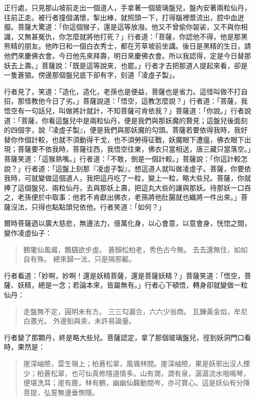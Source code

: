 正行處，只見那山坡前走出一個道人，手拿著一個玻璃盤兒，盤內安著兩粒仙丹，往前正走。被行者撞個滿懷，掣出棒，就照頭一下，打得腦裡漿流出，腔中血迸攛。菩薩大驚道：「你這個猴子，還是這等放潑。他又不曾偷你袈裟，又不與你相識，又無甚冤仇，你怎麼就將他打死？」行者道：「菩薩，你認他不得，他是那黑熊精的朋友。他昨日和一個白衣秀士，都在芳草坡前坐講。後日是黑精的生日，請他們來慶佛衣會。今日他先來拜壽，明日來慶佛衣會。所以我認得，定是今日替那妖去上壽。」菩薩說：「既是這等說來，也罷。」行者才去把那道人提起來看，卻是一隻蒼狼。傍邊那個盤兒底下卻有字，刻道「凌虛子製」。

行者見了，笑道：「造化，造化，老孫也是便益，菩薩也是省力。這怪叫做不打自招，那怪教他今日了劣。」菩薩說道：「悟空，這教怎麼說？」行者道：「菩薩，我悟空有一句話兒，叫做將計就計，不知菩薩可肯依我？」菩薩道：「你說。」行者說道：「菩薩，你看這盤兒中是兩粒仙丹，便是我們與那妖魔的贄見；這盤兒後面刻的四個字，說『凌虛子製』，便是我們與那妖魔的勾頭。菩薩若要依得我時，我好替你作個計較，也就不須動得干戈，也不須勞得征戰，妖魔眼下遭瘟，佛衣眼下出現；菩薩要不依我時，菩薩往西，我悟空往東，佛衣只當相送，唐三藏只當落空。」菩薩笑道：「這猴熟嘴。」行者道：「不敢，倒是一個計較。」菩薩說：「你這計較怎說？」行者道：「這盤上刻那『凌虛子製』，想這道人就叫做凌虛子。菩薩，你要依我時，可就變做這個道人，我把這丹吃了一粒，變上一粒，略大些兒。菩薩，你就捧了這個盤兒、兩粒仙丹，去與那妖上壽，把這丸大些的讓與那妖。待那妖一口吞之，老孫便於中取事：他若不肯獻出佛衣，老孫將他肚腸就也織將一件出來。」菩薩沒法，只得也點點頭兒依他。行者笑道：「如何？」

爾時菩薩迺以廣大慈悲，無邊法力，億萬化身，以心會意，以意會身，恍惚之間，變作凌虛仙子：
\begin{quote}
鶴氅仙風颯，飄颻欲步虛。
蒼顏松柏老，秀色古今無。
去去還無住，如如自有殊。
總來歸一法，只是隔邪軀。
\end{quote}

行者看道：「妙啊，妙啊！還是妖精菩薩，還是菩薩妖精？」菩薩笑道：「悟空，菩薩、妖精，總是一念；若論本來，皆屬無有。」行者心下頓悟，轉身卻就變做一粒仙丹：
\begin{quote}
走盤無不定，圓明未有方。
三三勾漏合，六六少翁商。
瓦鑠黃金焰，牟尼白晝光。
外邊鉛與汞，未許易論量。
\end{quote}

行者變了那顆丹，終是略大些兒。菩薩認定，拿了那個玻璃盤兒，徑到妖洞門口看時，果然是：
\begin{quote}
崖深岫險，雲生嶺上；柏蒼松翠，風颯林間。崖深岫險，果是妖邪出沒人煙少；柏蒼松翠，也可仙真修隱道情多。山有澗，澗有泉，潺潺流水咽鳴琴，便堪洗耳；崖有鹿，林有鶴，幽幽仙籟動間岑，亦可賞心。這是妖仙有分降菩提，弘誓無邊垂惻隱。
\end{quote}

